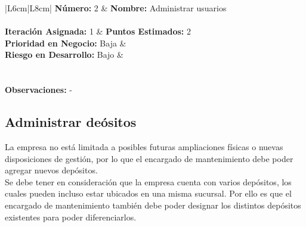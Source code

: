 \documentclass[a4paper, 12pt,twoside]{report}  %
\numberwithin{equation}{subsection} %
\begin{document}
\begin{table}[h!]
	\centering
	\begin{tabularx}
		{\textwidth}{|L{6cm}|L{8cm}|}
		\hline 
		\textbf{Número:} 2 & \textbf{Nombre:} Administrar usuarios \\ \hline
		\\ \hline
		\textbf{Iteración Asignada:} 1 & \textbf{Puntos Estimados:} 2 \\ \hline
		\textbf{Prioridad en Negocio:} Baja & \\
		 \textbf{Riesgo en Desarrollo:} Bajo & \\ \hline
		\\
		
		\hline
		\\
		
		\hline
		{\textbf{Observaciones:} - }\\
		
		\hline
	\end{tabularx}
	\caption*{Tabla A.: Refinamiento de \hyperlink{US}{US} 2.}
\end{table}


\pagebreak

\subsection*{Administrar deósitos}
La empresa no está limitada a posibles futuras ampliaciones físicas o nuevas disposiciones de gestión, por lo que el encargado de mantenimiento debe poder agregar nuevos depósitos.\\
\indent Se debe tener en consideración que la empresa cuenta con varios depósitos, los cuales pueden incluso estar ubicados en una misma sucursal. Por ello es que el encargado de mantenimiento también debe poder designar los distintos depósitos existentes para poder diferenciarlos.
\end{document}
